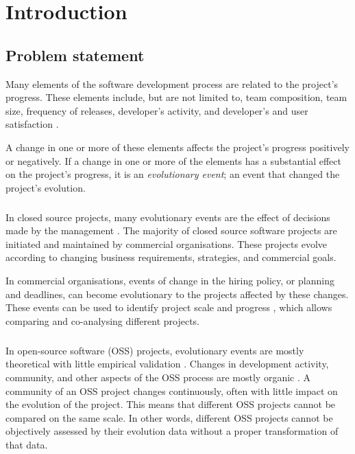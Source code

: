 \chapter{Introduction}
\label{introduction}

\section{Problem statement}
Many elements of the software development process are related to the project's
progress. These elements include, but are not limited to, team composition,
team size, frequency of releases, developer's activity, and developer's and
user satisfaction \cite{crowston2006, delone1992, samoladas2010}.

A change in one or more of these elements affects the project's progress
positively or negatively. If a change in one or more of the elements has a
substantial effect on the project's progress, it is an \textit{evolutionary
event}; an event that changed the project's evolution.

\paragraph{}
In closed source projects, many evolutionary events are the effect of decisions
made by the management \cite{karus2013}. The majority of closed source software
projects are initiated and maintained by commercial organisations. These
projects evolve according to changing business requirements, strategies, and
commercial goals.

In commercial organisations, events of change in the hiring policy, or
planning and deadlines, can become evolutionary to the projects affected by
these changes. These events can be used to identify project scale and progress
\cite{karus2013}, which allows comparing and co-analysing different projects.

\paragraph{}
In open-source software (OSS) projects, evolutionary events are mostly
theoretical with little empirical validation \cite{karus2013}. Changes in
development activity, community, and other aspects of the OSS process are
mostly organic \cite{androutsellis}. A community of an OSS project changes
continuously, often with little impact on the evolution of the project. This
means that different OSS projects cannot be compared on the same scale. In
other words, different OSS projects cannot be objectively assessed by their
evolution data without a proper transformation of that data.

